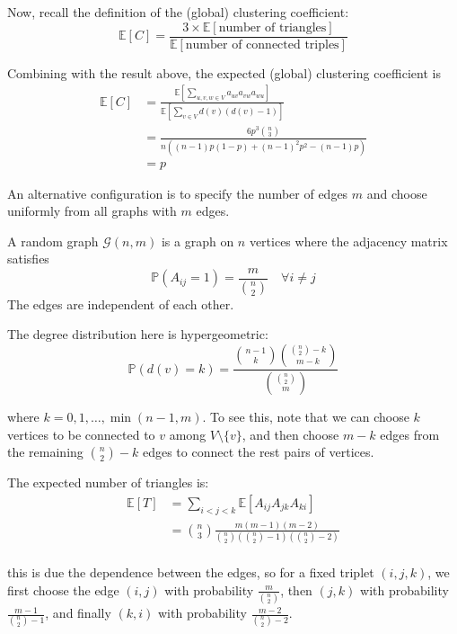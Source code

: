 \documentclass{article}
\begin{document}
Now, recall the definition of the (global) clustering coefficient:
\begin{equation*}
    \mathbb{E}[C] = \frac{3 \times \mathbb{E}[\text{number of triangles}]}{\mathbb{E}[\text{number of connected triples}]}
\end{equation*}

Combining with the result above, the expected (global) clustering coefficient is
\begin{align*}
    \mathbb{E}[C]&=\frac{\mathbb{E}[\sum_{u,v,w \in V} a_{uv}a_{vw}a_{wu}]}{\mathbb{E}[\sum_{v\in V} d(v)(d(v)-1)]} \\
    &= \frac{6p^3 \binom{n}{3}}{n ((n-1)p(1-p) + (n-1)^2p^2 -(n-1)p)}\\
    &=p
\end{align*}


An alternative configuration is to specify the number of edges $m$ and choose uniformly from all graphs with $m$ edges. 

\begin{definition}
    A random graph $\mathcal{G}(n,m)$ is a graph on $n$ vertices where the adjacency matrix satisfies
    \begin{equation*}
        \mathbb{P}(A_{ij}=1)=\frac{m}{\binom{n}{2}} \quad \forall i \neq j
    \end{equation*}
    The edges are independent of each other.
\end{definition}

The degree distribution here is hypergeometric:
$$
\mathbb{P}(d(v)=k)=\frac{\binom{n-1}{k}\binom{\binom{n}{2}-k}{m-k}}{\binom{\binom{n}{2}}{m}}
$$

where $k=0,1,\ldots,\min(n-1,m)$. To see this, note that we can choose $k$ vertices to be connected to $v$ among $V\setminus \{v\}$, and then choose $m-k$ edges from the remaining $\binom{n}{2}-k$ edges to connect the rest pairs of vertices. 

The expected number of triangles is:
\begin{align*}
    \mathbb{E}[T]&=\sum_{i<j<k} \mathbb{E}[A_{ij}A_{jk}A_{ki}]\\
    &=\binom{n}{3}\frac{m(m-1)(m-2)}{\binom{n}{2}\left(\binom{n}{2}-1\right)\left(\binom{n}{2}-2\right)}\\
\end{align*}

this is due the dependence between the edges, so for a fixed triplet $(i,j,k)$, we first choose the edge $(i,j)$ with probability $\frac{m}{\binom{n}{2}}$, then $(j,k)$ with probability $\frac{m-1}{\binom{n}{2}-1}$, and finally $(k,i)$ with probability $\frac{m-2}{\binom{n}{2}-2}$.  
\end{document}
